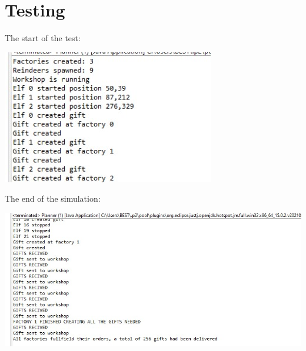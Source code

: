 \documentclass{article}
\begin{document}
\section{Testing}
The start of the test:
\begin{center}

  \includegraphics{test.JPG}

\end{center}
\newpage
The end of the simulation:
\begin{center}

  \includegraphics{test1.JPG}

\end{center}
\end{document}
